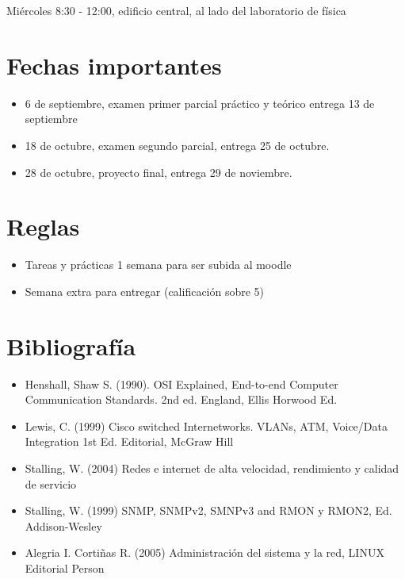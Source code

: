 Miércoles 8:30 - 12:00, edificio central, al lado del laboratorio de física

\section{Fechas importantes}
\begin{itemize}
    \item {6 de septiembre, examen primer parcial práctico y teórico entrega 13 de septiembre }
    \item {18 de octubre, examen segundo parcial, entrega 25 de octubre. }
    \item {28 de octubre, proyecto final, entrega 29 de noviembre. }
\end{itemize}

\section{Reglas}
\begin{itemize}
    \item {Tareas y prácticas 1 semana para ser subida al moodle}
    \item {Semana extra para entregar (calificación sobre 5)}
\end{itemize}

\section{Bibliografía}
\begin{itemize}
    \item {Henshall, Shaw S. (1990). OSI Explained, End-to-end Computer Communication Standards. 2nd ed. England, Ellis Horwood Ed.}
    \item {Lewis, C. (1999) Cisco switched Internetworks. VLANs, ATM, Voice/Data Integration 1st Ed. Editorial, McGraw Hill}
    \item {Stalling, W. (2004) Redes e internet de alta velocidad, rendimiento y calidad de servicio}
    \item {Stalling, W. (1999) SNMP, SNMPv2, SMNPv3 and RMON y RMON2, Ed. Addison-Wesley}
    \item {Alegria I. Cortiñas R. (2005) Administración del sistema y la red, LINUX Editorial Person}
\end{itemize}